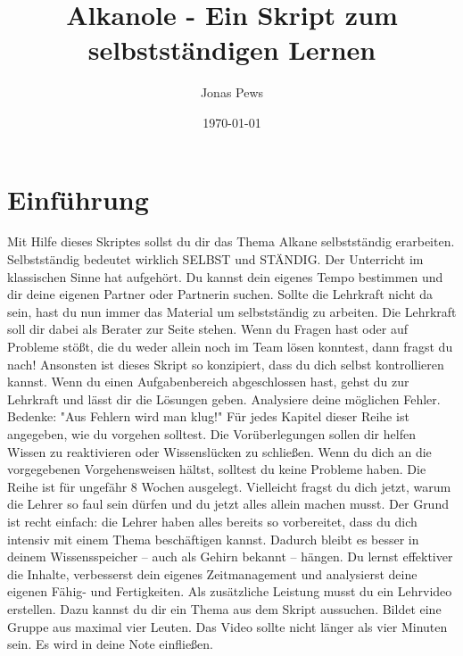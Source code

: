 \documentclass{scrartcl}  %
\author{Jonas Pews}
\title{Alkanole - Ein Skript zum selbstständigen Lernen}
\date{\today}
\begin{document}
	\maketitle
	
	\begin{center}
		\ccbyncsa
	\end{center}
	

\pagebreak

	\tableofcontents

\pagebreak
		
		\section{Einführung}
	
			Mit Hilfe dieses Skriptes sollst du dir das Thema Alkane selbstständig erarbeiten. Selbstständig bedeutet wirklich SELBST und STÄNDIG. Der Unterricht im klassischen Sinne hat aufgehört. Du kannst dein eigenes Tempo bestimmen und dir deine eigenen Partner oder Partnerin suchen. Sollte die Lehrkraft nicht da sein, hast du nun immer das Material um selbstständig zu arbeiten.
			Die Lehrkraft soll dir dabei als Berater zur Seite stehen. Wenn du Fragen hast oder auf Probleme stößt, die du weder allein noch im Team lösen konntest, dann fragst du nach!
			Ansonsten ist dieses Skript so konzipiert, dass du dich selbst kontrollieren kannst. Wenn du einen Aufgabenbereich abgeschlossen hast, gehst du zur Lehrkraft und lässt dir die Lösungen geben. Analysiere deine möglichen Fehler. Bedenke: "Aus Fehlern wird man klug!"
			Für jedes Kapitel dieser Reihe ist angegeben, wie du vorgehen solltest. Die Vorüberlegungen sollen dir helfen Wissen zu reaktivieren oder Wissenslücken zu schließen. Wenn du dich an die vorgegebenen Vorgehensweisen hältst, solltest du keine Probleme haben.
			Die Reihe ist für ungefähr 8 Wochen ausgelegt.
			Vielleicht fragst du dich jetzt, warum die Lehrer so faul sein dürfen und du jetzt alles allein machen musst. Der Grund ist recht einfach: die Lehrer haben alles bereits so vorbereitet, dass du dich intensiv mit einem Thema beschäftigen kannst. Dadurch bleibt es besser in deinem Wissensspeicher – auch als Gehirn bekannt – hängen. Du lernst effektiver die Inhalte, verbesserst dein eigenes Zeitmanagement und analysierst deine eigenen Fähig- und Fertigkeiten.
			Als zusätzliche Leistung musst du ein Lehrvideo erstellen. Dazu kannst du dir ein Thema aus dem Skript aussuchen. Bildet eine Gruppe aus maximal vier Leuten. Das Video sollte nicht länger als vier Minuten sein. Es wird in deine Note einfließen.
	
\end{document}
